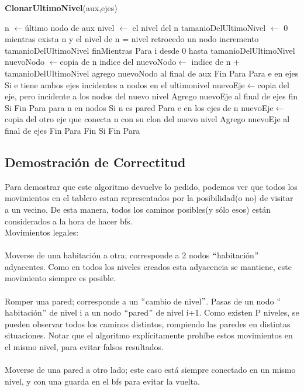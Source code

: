 \documentclass[spanish,12pt]{article}
\begin{document}
\begin{algorithm}[H]{\textbf{ClonarUltimoNivel}(aux,ejes)}
	\begin{algorithmic}[1]
		\State \quad n $\gets$último nodo  de aux
		\State \quad nivel $\gets$ el nivel del n
		\State \quad tamanioDelUltimoNivel $\gets$ 0 
		\State \quad mientras exista n y el nivel de n = nivel
			\State \quad \quad retrocedo un nodo
			\State \quad \quad incremento tamanioDelUltimoNivel
		\State \quad finMientras
		\State \quad Para i desde 0 hasta tamanioDelUltimoNivel
		  	\State \quad \quad nuevoNodo $\gets$copia de n
			\State \quad \quad indice del nuevoNodo$\gets$ indice de n + tamanioDelUltimoNivel
			\State \quad \quad agrego nuevoNodo al final de aux
		\State \quad Fin Para
		\State \quad Para e en ejes
		 	\State \quad \quad Si e tiene ambos ejes incidentes a nodos en el ultimonivel
		 		\State \quad \quad \quad nuevoEje$\gets$copia del eje, pero incidente a los nodos del nuevo nivel
		  		\State \quad \quad \quad  Agrego nuevoEje al final de ejes
		 	\State \quad \quad fin Si
		\State \quad Fin Para
		\State \quad para n en nodos
		  	\State \quad \quad  Si n es pared
				\State \quad \quad \quad Para e en los ejes de n
					\State \quad \quad \quad \quad  nuevoEje$\gets$copia del otro eje que conecta n con su clon del nuevo nivel
					\State \quad \quad \quad \quad Agrego nuevoEje al final de ejes
				\State \quad \quad \quad Fin Para
			\State \quad \quad Fin Si
		\State \quad Fin Para
	\end{algorithmic}
\end{algorithm}



\subsection{Demostración de Correctitud}
Para demostrar que este algoritmo devuelve lo pedido, podemos ver que todos los movimientos en el tablero estan representados por la posibilidad(o no) de visitar a un vecino. De esta manera, todos los caminos posibles(y sólo esos) están considerados a la hora de hacer bfs.\\
Movimientos legales:\\
\\
Moverse de una habitación a otra; corresponde a 2 nodos $``$habitación$"$ adyacentes. Como en todos los niveles creados esta adyacencia se mantiene, este movimiento siempre es posible.\\
\\
Romper una pared; corresponde a un $``$cambio de nivel$"$. Pasas de un nodo $``$habitación$"$ de nivel i a un nodo $``$pared$"$ de nivel i+1. Como existen P niveles, se pueden observar todos los caminos distintos, rompiendo las paredes en distintas situaciones. Notar que el algoritmo explícitamente prohíbe estos movimientos en el mismo nivel, para evitar falsos resultados.\\
\\
Moverse de una pared a otro lado; este caso está siempre conectado en un mismo nivel, y con una guarda en el bfs para evitar la vuelta.
\end{document}
